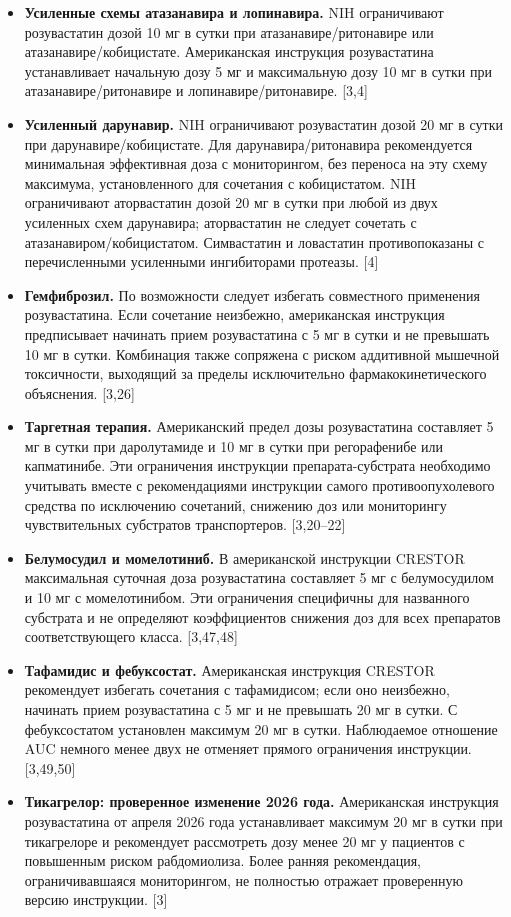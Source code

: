 \documentclass[11pt]{article}
\begin{document}
\begin{itemize}
\item \textbf{Усиленные схемы атазанавира и лопинавира.} NIH ограничивают розувастатин дозой 10 мг в сутки при атазанавире/ритонавире или атазанавире/кобицистате. Американская инструкция розувастатина устанавливает начальную дозу 5 мг и максимальную дозу 10 мг в сутки при атазанавире/ритонавире и лопинавире/ритонавире. [3,4]
\item \textbf{Усиленный дарунавир.} NIH ограничивают розувастатин дозой 20 мг в сутки при дарунавире/кобицистате. Для дарунавира/ритонавира рекомендуется минимальная эффективная доза с мониторингом, без переноса на эту схему максимума, установленного для сочетания с кобицистатом. NIH ограничивают аторвастатин дозой 20 мг в сутки при любой из двух усиленных схем дарунавира; аторвастатин не следует сочетать с атазанавиром/кобицистатом. Симвастатин и ловастатин противопоказаны с перечисленными усиленными ингибиторами протеазы. [4]
\item \textbf{Гемфиброзил.} По возможности следует избегать совместного применения розувастатина. Если сочетание неизбежно, американская инструкция предписывает начинать прием розувастатина с 5 мг в сутки и не превышать 10 мг в сутки. Комбинация также сопряжена с риском аддитивной мышечной токсичности, выходящий за пределы исключительно фармакокинетического объяснения. [3,26]
\item \textbf{Таргетная терапия.} Американский предел дозы розувастатина составляет 5 мг в сутки при даролутамиде и 10 мг в сутки при регорафенибе или капматинибе. Эти ограничения инструкции препарата-субстрата необходимо учитывать вместе с рекомендациями инструкции самого противоопухолевого средства по исключению сочетаний, снижению доз или мониторингу чувствительных субстратов транспортеров. [3,20--22]
\item \textbf{Белумосудил и момелотиниб.} В американской инструкции CRESTOR максимальная суточная доза розувастатина составляет 5 мг с белумосудилом и 10 мг с момелотинибом. Эти ограничения специфичны для названного субстрата и не определяют коэффициентов снижения доз для всех препаратов соответствующего класса. [3,47,48]
\item \textbf{Тафамидис и фебуксостат.} Американская инструкция CRESTOR рекомендует избегать сочетания с тафамидисом; если оно неизбежно, начинать прием розувастатина с 5 мг и не превышать 20 мг в сутки. С фебуксостатом установлен максимум 20 мг в сутки. Наблюдаемое отношение AUC немного менее двух не отменяет прямого ограничения инструкции. [3,49,50]
\item \textbf{Тикагрелор: проверенное изменение 2026 года.} Американская инструкция розувастатина от апреля 2026 года устанавливает максимум 20 мг в сутки при тикагрелоре и рекомендует рассмотреть дозу менее 20 мг у пациентов с повышенным риском рабдомиолиза. Более ранняя рекомендация, ограничивавшаяся мониторингом, не полностью отражает проверенную версию инструкции. [3]

\end{itemize}
\end{document}
